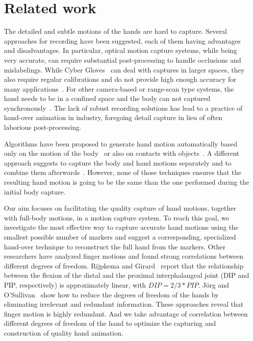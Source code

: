 
\section{Related work}

The detailed and subtle motions of the hands are hard to capture. Several approaches for recording have been suggested, each of them having advantages and disadvantages. In particular, optical motion capture systems, while being very accurate, can require substantial post-processing to handle occlusions and mislabelings. While Cyber Gloves~ can deal with captures in larger spaces, they also require regular calibrations and do not provide high enough accuracy for many applications~\cite{KahZacKle04}. For other camera-based or range-scan type systems, the hand needs to be in a confined space and the body can not captured synchronously~\cite{WanPop09,ZhaChaXu12}. The lack of robust recording solutions has lead to a practice of hand-over animation in industry, foregoing detail capture in lieu of often laborious post-processing.

Algorithms have been proposed to generate hand motion automatically based only on the motion of the body~\cite{JoeHodSaf12} or also on contacts with objects~\cite{YeLiu12}. A different approach suggests to capture the body and hand motions separately and to combine them afterwards~\cite{MajZorFal06}. However, none of those techniques ensures that the resulting hand motion is going to be the same than the one performed during the initial body capture. 

Our aim focuses on facilitating the quality capture of hand motions, together with full-body motions, in a motion capture system. To reach this goal, we investigate the most effective way to capture accurate hand motions using the smallest possible number of markers and suggest a corresponding, specialized hand-over technique to reconstruct the full hand from the markers. Other researchers have analyzed finger motions and found strong correlations between different degrees of freedom. Rijpkema and Girard~ report that the relationship between the flexion of the distal and the proximal interphalangeal joint (DIP and PIP, respectively) is approximately linear, with $DIP=2/3*PIP$. J\"{o}rg and O'Sullivan~ show how to reduce the degrees of freedom of the hands by eliminating irrelevant and redundant information. These approaches reveal that finger motion is highly redundant. And we take advantage of  correlation between different degrees of freedom of the hand to optimize the capturing and construction of quality hand animation.


